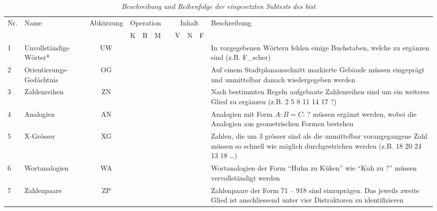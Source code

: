 \documentclass[11pt, twoside, a4paper]{book}		%
\begin{document}
\begin{sidewaystable}
	
	
	\begin{adjustbox}{width=\textwidth,totalheight=.9\textheight,keepaspectratio}
		
		\begin{threeparttable}
			\captionsetup{labelsep = none}
			\caption[Die Subtests des BIS-Test]{\newline  \textit{Beschreibung und Reihenfolge der eingesetzten Subtests des \gls{bist}} \vspace{.2cm}}
			\label{tab:BIS}

			\begin{tabular}{l l c c c c p{.0001cm} c c c p{20cm}}
				
				\hline
				Nr.	&	Name	&	Abkürzung	& \multicolumn{3}{c}{Operation}	&	&	\multicolumn{3}{c}{Inhalt}	&	Beschreibung\\
				\cline{4-6}
				\cline{8-10}
				&&&	K	& B & M	&&	V	&	N	&	F	& \\
				\hline
				1				&	Unvollständige Wörter*	&	UW			&&	\checkmark	&&&\checkmark&&& In vorgegebenen Wörtern fehlen einige Buchstaben, welche zu ergänzen sind (z.B. F\_scher)	\\
				2				&	Orientierungs-Gedächtnis	&	OG		&&&	\checkmark	&&&&\checkmark& Auf einem Stadtplanausschnitt markierte Gebäude müssen eingeprägt und unmittelbar danach wiedergegeben werden\\
				3				&	Zahlenreihen			&	ZN			&	\checkmark	&&&&&\checkmark&& Nach bestimmten Regeln aufgebaute Zahlenreihen sind um ein weiteres Glied zu ergänzen (z.B. 2 5 8 11 14 17 ?)\\
				4				&	Analogien				&	AN			&	\checkmark	&&&&&&\checkmark& Analogien mit Form $A:B=C:\,?$ müssen ergänzt werden, wobei die Analogien aus geometrischen Formen bestehen\\
				5				&	X-Grösser				&	XG			&&	\checkmark	&&&&\checkmark&& Zahlen, die um $3$ grösser sind als die unmittelbar vorangegangene Zahl müssen so schnell wie möglich durchgestrichen werden (z.B. 18 20 24 \cancel{27} 13 18 \cancel{21} \ldots)\\
				6				&	Wortanalogien			&	WA			&	\checkmark	&&&&\checkmark&&& Wortanalogien der Form \enquote{Huhn zu Küken} wie \enquote{Kuh zu ?} müssen vervollständigt werden\\
				7				&	Zahlenpaare				&	ZP			&&&	\checkmark	&&&\checkmark&& Zahlenpaare der Form 71 -- 918 sind einzuprägen. Das jeweils zweite Glied ist anschliessend unter vier Distraktoren zu identifizieren\\

\end{tabular}
\end{threeparttable}
\end{adjustbox}
\end{sidewaystable}
\end{document}

